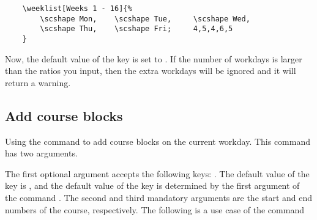 \documentclass[letterpaper]{l3doc}
\newenvironment{example}{\begin{list}{}{\leftmargin=3em}\item }{\end{list}}
\begin{document}
\begin{Verbatim}
    \weeklist[Weeks 1 - 16]{%
        \scshape Mon,    \scshape Tue,     \scshape Wed,
        \scshape Thu,    \scshape Fri;     4,5,4,6,5
    }
\end{Verbatim}

\begin{figure}[!ht]
    \centering
\end{figure}

Now, the default value of the key  is set to . If the number of workdays is larger than the ratios you input, then the extra workdays will be ignored and it will return a warning.

\subsection{Add course blocks}

Using the  command to add course blocks on the current workday. This command has two arguments.

\begin{example}
\end{example}

The first optional argument accepts the following keys:     . The default value of the key  is , and the default value of the key  is determined by the first argument of the command . The second and third mandatory arguments are the start and end numbers of the course, respectively. The following is a use case of the command 
\end{document}
